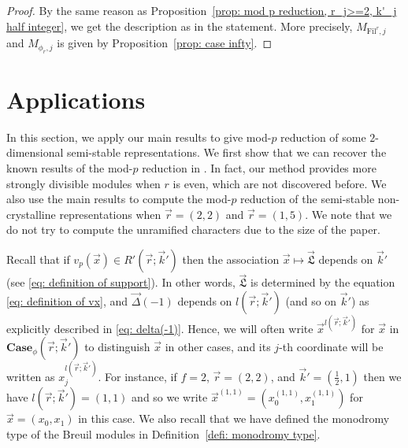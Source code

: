 \documentclass[11pt]{amsart}
\theoremstyle{definition}
\numberwithin{equation}{subsection}
\theoremstyle{plain}
\theoremstyle{plain}
\theoremstyle{plain}
\theoremstyle{plain}
\theoremstyle{plain}
\theoremstyle{plain}
\theoremstyle{plain}
\theoremstyle{plain}
\theoremstyle{plain}
\theoremstyle{plain}
\theoremstyle{plain}
\theoremstyle{plain}
\theoremstyle{definition}
\theoremstyle{definition}
\theoremstyle{definition}
\theoremstyle{remark}
\renewcommand{\(}{\textup{(}}
\renewcommand{\)}{\textup{)}}
\newcommand{\fL}{\mathfrak{L}}
\newcommand{\Fil}{\mathrm{Fil}}
\newcommand{\vx}{\vec{x}}
\newcommand{\vr}{\vec{r}}
\newcommand{\vL}{\vec{\fL}}
\newcommand{\vk}{\vec{k}}
\newcommand{\vDel}{\vec{\Delta}}
\begin{document}
\begin{proof}
By the same reason as Proposition~\ref{prop: mod p reduction, r_j>=2, k'_j half integer}, we get the description as in the statement. More precisely, $M_{\Fil^r,j}$ and $M_{\phi_r,j}$ is given by Proposition~\ref{prop: case infty}.
\end{proof}
































\smallskip



\section{Applications}\label{sec: examples}
In this section, we apply our main results to give mod-$p$ reduction of some $2$-dimensional semi-stable representations. We first show that we can recover the known results of the mod-$p$ reduction in \cite{BM,GP,LP}. In fact, our method provides more strongly divisible modules when $r$ is even, which are not discovered before.  We also use the main results to compute the mod-$p$ reduction of the semi-stable non-crystalline representations when $\vr=(2,2)$ and $\vr=(1,5)$. We note that we do not try to compute the unramified characters due to the size of the paper.

Recall that if $v_p(\vx)\in R'(\vr;\vk')$ then the association $\vx\mapsto \vL$ depends on $\vk'$ (see \eqref{eq: definition of support}). In other words, $\vL$ is determined by the equation \eqref{eq: definition of vx}, and $\vDel(-1)$ depends on $l(\vr;\vk')$ (and so on $\vk'$) as explicitly described in \eqref{eq: delta(-1)}. Hence, we will often write $\vx^{l(\vr;\vk')}$ for $\vx$ in $\mathbf{Case}_\phi(\vr;\vk')$ to distinguish $\vx$ in other cases, and its $j$-th coordinate will be written as $x^{l(\vr;\vk')}_j$. For instance, if $f=2$, $\vr=(2,2)$, and $\vk'=(\frac{1}{2},1)$ then we have $l(\vr;\vk')=(1,1)$ and so we write $\vx^{(1,1)}=(x^{(1,1)}_0,x^{(1,1)}_1)$ for $\vx=(x_0,x_1)$ in this case. We also recall that we have defined the monodromy type of the Breuil modules in Definition~\ref{defi: monodromy type}.
\end{document}
